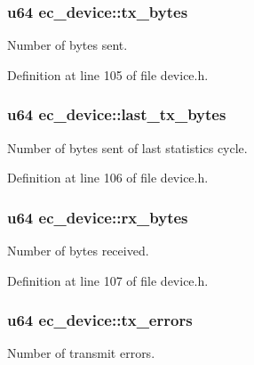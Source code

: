 \subsubsection[{tx\-\_\-bytes}]{\setlength{\rightskip}{0pt plus 5cm}u64 {\bf ec\-\_\-device\-::tx\-\_\-bytes}}\label{structec__device_a969a3e6f0057eeb8b1becc34d500e281}


\-Number of bytes sent. 



\-Definition at line 105 of file device.\-h.

\subsubsection[{last\-\_\-tx\-\_\-bytes}]{\setlength{\rightskip}{0pt plus 5cm}u64 {\bf ec\-\_\-device\-::last\-\_\-tx\-\_\-bytes}}\label{structec__device_ac4a738c0943134edc5c68f2c85b9a089}


\-Number of bytes sent of last statistics cycle. 



\-Definition at line 106 of file device.\-h.

\subsubsection[{rx\-\_\-bytes}]{\setlength{\rightskip}{0pt plus 5cm}u64 {\bf ec\-\_\-device\-::rx\-\_\-bytes}}\label{structec__device_afea25f45c6911c97a08b8615154a2b91}


\-Number of bytes received. 



\-Definition at line 107 of file device.\-h.

\subsubsection[{tx\-\_\-errors}]{\setlength{\rightskip}{0pt plus 5cm}u64 {\bf ec\-\_\-device\-::tx\-\_\-errors}}\label{structec__device_a076ce4fd0d53e53ba7236b12bf4ecf66}


\-Number of transmit errors. 



